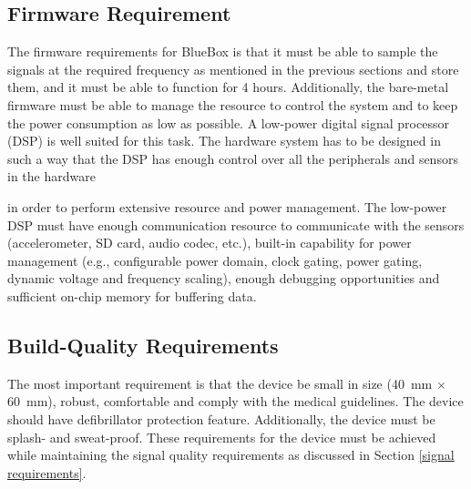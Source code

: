 \subsection{Firmware Requirement }

The firmware requirements for BlueBox is that it must be able to
sample the signals at the required frequency as mentioned in the
previous sections and store them, and it must be able to function for
4 hours. Additionally, the bare-metal firmware must be able to manage
the resource to control the system and to keep the power consumption
as low as possible. A low-power digital signal processor (DSP) is
well suited for this task. The hardware system has to be designed in
such a way that the DSP has enough control over all the peripherals 
and sensors in the hardware
\begin{comment}
\begin{cmtPai}
	(2/17/2017) I don't understand what you mean here
\end{cmtPai}
\begin{cmtSMS}
	(2/18/2017) I actually wanted to say that the firmware should be able to have good control the DSP (Enabling/disabling clocks , shutting down unused peripherals etc.,). Hardware system is to be designed in such a way that , all the sensors \& the components can be controlled by the firmware.
	Ex: In the BlueBox hardware system, from the firmware we can control only the Bias voltage of one of the microphone , the other one is always fixed.
	From the firmware, through the use of GPIO, we can switch on/off the body temperature sensor, reset the AIC3204, ADS1292 etc.,
	Firmware should have extensive control over all the components.	
	 
\end{cmtSMS}
\end{comment}
in order to perform extensive resource and power management. The
low-power DSP must have enough communication resource to communicate
with the sensors (accelerometer, SD card, audio codec, etc.),
built-in capability for power management (e.g., configurable power
domain, clock gating, power gating, dynamic voltage and frequency
scaling), enough debugging opportunities and sufficient on-chip
memory for buffering data. 

\subsection {Build-Quality Requirements} 

The most important requirement is that the device be small in size
(40~mm $\times$ 60~mm), robust, comfortable and comply with the
medical guidelines. The device should have defibrillator protection
feature.  Additionally, the device must be splash- and sweat-proof.
These requirements for the device must be achieved while maintaining
the signal quality requirements as discussed in Section \ref{signal
requirements}.  


